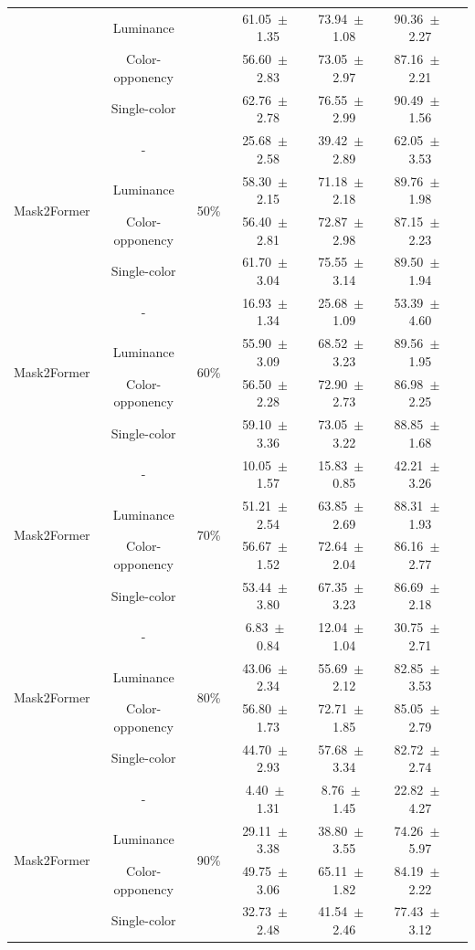 \begin{table}[h]
\begin{tabular}{@{}lccc ccc@{}}
& Luminance & & 61.05~$\pm$~1.35 & 73.94~$\pm$~1.08 & 90.36~$\pm$~2.27 \\
& Color-opponency & & 56.60~$\pm$~2.83 & 73.05~$\pm$~2.97 & 87.16~$\pm$~2.21 \\
& Single-color & & 62.76~$\pm$~2.78 & 76.55~$\pm$~2.99 & 90.49~$\pm$~1.56 \\
\midrule
\multirow{4}{*}{Mask2Former} & - & \multirow{4}{*}{50\%} & 25.68~$\pm$~2.58 & 39.42~$\pm$~2.89 & 62.05~$\pm$~3.53 \\
& Luminance & & 58.30~$\pm$~2.15 & 71.18~$\pm$~2.18 & 89.76~$\pm$~1.98 \\
& Color-opponency & & 56.40~$\pm$~2.81 & 72.87~$\pm$~2.98 & 87.15~$\pm$~2.23 \\
& Single-color & & 61.70~$\pm$~3.04 & 75.55~$\pm$~3.14 & 89.50~$\pm$~1.94 \\
\midrule
\multirow{4}{*}{Mask2Former} & - & \multirow{4}{*}{60\%} & 16.93~$\pm$~1.34 & 25.68~$\pm$~1.09 & 53.39~$\pm$~4.60 \\
& Luminance & & 55.90~$\pm$~3.09 & 68.52~$\pm$~3.23 & 89.56~$\pm$~1.95 \\
& Color-opponency & & 56.50~$\pm$~2.28 & 72.90~$\pm$~2.73 & 86.98~$\pm$~2.25 \\
& Single-color & & 59.10~$\pm$~3.36 & 73.05~$\pm$~3.22 & 88.85~$\pm$~1.68 \\
\midrule
\multirow{4}{*}{Mask2Former} & - & \multirow{4}{*}{70\%} & 10.05~$\pm$~1.57 & 15.83~$\pm$~0.85 & 42.21~$\pm$~3.26 \\
& Luminance & & 51.21~$\pm$~2.54 & 63.85~$\pm$~2.69 & 88.31~$\pm$~1.93 \\
& Color-opponency & & 56.67~$\pm$~1.52 & 72.64~$\pm$~2.04 & 86.16~$\pm$~2.77 \\
& Single-color & & 53.44~$\pm$~3.80 & 67.35~$\pm$~3.23 & 86.69~$\pm$~2.18 \\
\midrule
\multirow{4}{*}{Mask2Former} & - & \multirow{4}{*}{80\%} & 6.83~$\pm$~0.84 & 12.04~$\pm$~1.04 & 30.75~$\pm$~2.71 \\
& Luminance & & 43.06~$\pm$~2.34 & 55.69~$\pm$~2.12 & 82.85~$\pm$~3.53 \\
& Color-opponency & & 56.80~$\pm$~1.73 & 72.71~$\pm$~1.85 & 85.05~$\pm$~2.79 \\
& Single-color & & 44.70~$\pm$~2.93 & 57.68~$\pm$~3.34 & 82.72~$\pm$~2.74 \\
\midrule
\multirow{4}{*}{Mask2Former} & - & \multirow{4}{*}{90\%} & 4.40~$\pm$~1.31 & 8.76~$\pm$~1.45 & 22.82~$\pm$~4.27 \\
& Luminance & & 29.11~$\pm$~3.38 & 38.80~$\pm$~3.55 & 74.26~$\pm$~5.97 \\
& Color-opponency & & 49.75~$\pm$~3.06 & 65.11~$\pm$~1.82 & 84.19~$\pm$~2.22 \\
& Single-color & & 32.73~$\pm$~2.48 & 41.54~$\pm$~2.46 & 77.43~$\pm$~3.12 \\
\midrule
\bottomrule
\end{tabular}
\label{tab:sparse_results_mask2former_acdc_fog}
\end{table}